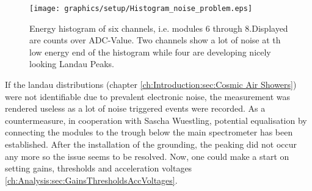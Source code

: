   \begin{figure}
   \centering
   \texttt{[image: graphics/setup/Histogram\_noise\_problem.eps]}
   \caption[Six channel energy Histogram with noise]{Energy histogram of six channels, i.e. modules 6 through 8.Displayed are counts over ADC-Value. Two channels show a lot of noise at th low energy end of the histogram while four are developing nicely looking Landau Peaks.}
  \end{figure}
  If the landau distributions (chapter \ref{ch:Introduction:sec:Cosmic Air Showers}) were not identifiable due to prevalent electronic noise, the measurement was rendered useless as a lot of noise triggered events were recorded.
  As a countermeasure, in cooperation with Sascha Wuestling, potential equalisation by connecting the modules to the trough below the main spectrometer has been established. After the installation of the grounding, the peaking did not occur any more so the issue seems to be resolved. Now, one could make a start on setting gains, thresholds and acceleration voltages \ref{ch:Analysis:sec:GainsThresholdsAccVoltages}.
  
